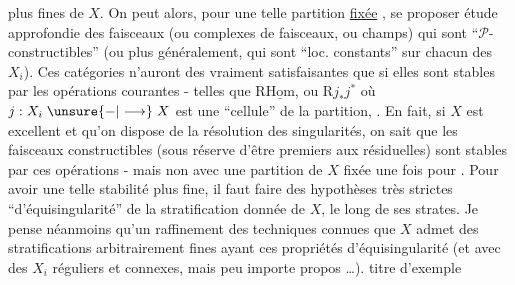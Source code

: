 plus fines de $X$. On peut alors, pour une telle partition \uline{fixée} , se proposer  étude approfondie  des faisceaux (ou complexes de faisceaux, ou champs) qui sont ``$\mathcal P$-constructibles'' (ou plus généralement, qui sont ``loc. constants'' sur chacun des $X_i$). Ces catégories n'auront des   vraiment satisfaisantes que si elles sont stables par les opérations courantes - telles que $\mathrm R\underline{\mathrm{Hom}}$, ou $\mathrm Rj_*j^*$ où $j:X_i\mathrel{\unsure{-|\longrightarrow}}X$ est une ``cellule'' de la partition,  . En fait, si $X$ est excellent et qu'on dispose de la résolution des singularités, on sait que les faisceaux  constructibles  (sous réserve d'être premiers aux  résiduelles) sont stables par  ces opérations - mais non avec une partition de $X$ fixée une fois pour . Pour avoir une telle stabilité plus fine, il faut faire des hypothèses très strictes  ``d'équisingularité'' de la stratification donnée de $X$, le long de ses strates. Je pense néanmoins qu'un raffinement des techniques connues  que $X$ admet des stratifications arbitrairement fines ayant ces propriétés d'équisingularité (et avec des $X_i$ réguliers et connexes, mais peu importe   propos \ldots).  titre d'exemple
